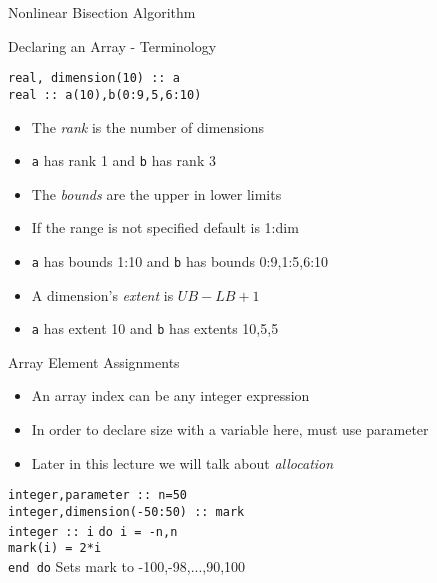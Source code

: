 \documentclass{beamer}
\begin{document}
\begin{frame}[allowframebreaks]{Nonlinear Bisection Algorithm}
\begin{scriptsize}
  
  
  
\end{scriptsize}
\end{frame}
\begin{frame}{Declaring an Array - Terminology}

\texttt{real, dimension(10) :: a} \\
\texttt{real :: a(10),b(0:9,5,6:10)}\\

  \begin{itemize}

    \vfill
    \item The \emph{rank} is the number of dimensions
    \item \texttt{a} has rank 1 and \texttt{b} has rank 3
    \vfill
    \item The \emph{bounds} are the upper in lower limits
    \item If the range is not specified default is 1:dim
    \item \texttt{a} has bounds 1:10 and \texttt{b} has bounds 0:9,1:5,6:10
    \vfill
    \item A dimension's \emph{extent} is $UB-LB+1$
    \item \texttt{a} has extent 10 and \texttt{b} has extents 10,5,5

  \end{itemize}

\end{frame}
\begin{frame}{Array Element Assignments}

  \begin{itemize}
    \item An array index can be any integer expression
    \vfill\item In order to declare size with a variable here, must use parameter
    \vfill\item Later in this lecture we will talk about \emph{allocation}
  \end{itemize}
  \vfill
  \texttt{integer,parameter :: n=50} \\
  \texttt{integer,dimension(-50:50) :: mark} \\
  \texttt{integer :: i}
  \texttt{do i = -n,n} \\
    \hspace{0.1cm} \texttt{mark(i) = 2*i} \\
  \texttt{end do}
  \vfill
  Sets mark to -100,-98,...,90,100
\end{frame}
\end{document}
